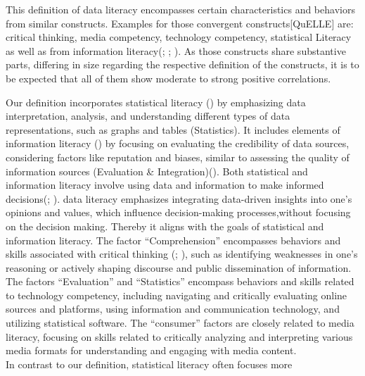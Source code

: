 \documentclass[
  12pt,
  a4paper,
  twoside]{article}
\begin{document}
This definition of data literacy encompasses certain characteristics and
behaviors from similar constructs. Examples for those convergent
constructs{[}QuELLE{]} are: critical thinking, media competency,
technology competency, statistical Literacy as well as from information
literacy(;
;
). As those constructs
share substantive parts, differing in size regarding the respective
definition of the constructs, it is to be expected that all of them show
moderate to strong positive correlations.

Our definition incorporates statistical literacy
() by emphasizing data interpretation,
analysis, and understanding different types of data representations,
such as graphs and tables (Statistics). It includes elements of
information literacy () by focusing on evaluating the credibility of
data sources, considering factors like reputation and biases, similar to
assessing the quality of information sources (Evaluation \&
Integration)(). Both
statistical and information literacy involve using data and information
to make informed decisions(;
). data literacy
emphasizes integrating data-driven insights into one's opinions and
values, which influence decision-making processes,without focusing on
the decision making. Thereby it aligns with the goals of statistical and
information literacy. The factor ``Comprehension'' encompasses behaviors
and skills associated with critical thinking
(;
), such as identifying weaknesses in
one's reasoning or actively shaping discourse and public dissemination
of information. The factors ``Evaluation'' and ``Statistics'' encompass
behaviors and skills related to technology competency, including
navigating and critically evaluating online sources and platforms, using
information and communication technology, and utilizing statistical
software. The ``consumer'' factors are closely related to media
literacy, focusing on skills related to critically analyzing and
interpreting various media formats for understanding and engaging with
media content.\\
In contrast to our definition, statistical literacy often focuses more
\end{document}
